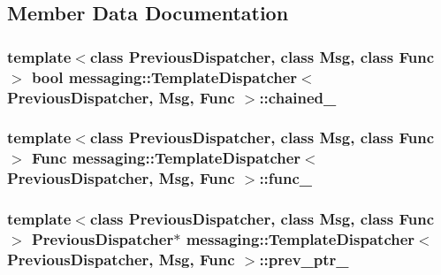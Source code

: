 \subsection{Member Data Documentation}
\hypertarget{classmessaging_1_1TemplateDispatcher_a51f4255d452392ab1ca7d193d3209d4a}{
\subsubsection[{chained\-\_\-}]{\setlength{\rightskip}{0pt plus 5cm}template$<$class Previous\-Dispatcher, class Msg, class Func$>$ bool {\bf messaging\-::\-Template\-Dispatcher}$<$ Previous\-Dispatcher, Msg, Func $>$\-::chained\-\_\-\hspace{0.3cm}{\ttfamily [private]}}}\label{classmessaging_1_1TemplateDispatcher_a51f4255d452392ab1ca7d193d3209d4a}
\hypertarget{classmessaging_1_1TemplateDispatcher_aae5b9ea3d2b58005b6ddec368db2bcb0}{
\subsubsection[{func\-\_\-}]{\setlength{\rightskip}{0pt plus 5cm}template$<$class Previous\-Dispatcher, class Msg, class Func$>$ Func {\bf messaging\-::\-Template\-Dispatcher}$<$ Previous\-Dispatcher, Msg, Func $>$\-::func\-\_\-\hspace{0.3cm}{\ttfamily [private]}}}\label{classmessaging_1_1TemplateDispatcher_aae5b9ea3d2b58005b6ddec368db2bcb0}
\hypertarget{classmessaging_1_1TemplateDispatcher_a873bc46a8c8cff1ddcceb225ad252e01}{
\subsubsection[{prev\-\_\-ptr\-\_\-}]{\setlength{\rightskip}{0pt plus 5cm}template$<$class Previous\-Dispatcher, class Msg, class Func$>$ Previous\-Dispatcher$\ast$ {\bf messaging\-::\-Template\-Dispatcher}$<$ Previous\-Dispatcher, Msg, Func $>$\-::prev\-\_\-ptr\-\_\-\hspace{0.3cm}{\ttfamily [private]}}}\label{classmessaging_1_1TemplateDispatcher_a873bc46a8c8cff1ddcceb225ad252e01}
